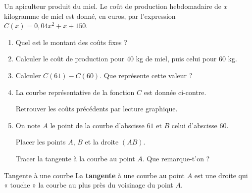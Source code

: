 \documentclass[10pt,a4paper,openany,twoside, eleve]{book}
\begin{document}
\begin{exon}
  Un apiculteur produit du miel.
  Le co\^ut de production hebdomadaire de $x$ kilogramme de miel
  est donné, en euros, par l'expression
  $C(x)=0,04x^2+x+150$.

  \begin{minipage}[t]{0.5\textwidth}
    \vspace{-5.5cm}
    \begin{enumerate}
      \item Quel est le montant des co\^uts fixes ?
      \item Calculer le co\^ut de production pour 40 kg de miel,
            puis celui pour 60 kg.
      \item Calculer $C(61)-C(60)$. Que représente cette valeur ?
      \item La courbe représentative de la fonction $C$ est donnée ci-contre.

            Retrouver les co\^uts précédents par lecture graphique.
      \item On note $A$ le point de la courbe d'abscisse $61$
            et $B$ celui d'abscisse $60$.

            Placer les points $A$, $B$ et la droite $(AB)$.

            Tracer la tangente à la courbe au point $A$.
            Que remarque-t'on ?
    \end{enumerate}
  \end{minipage}
  \begin{minipage}[t]{0.5\textwidth}
  \end{minipage}

\end{exon}

\newpage

\begin{defi}{Tangente à une courbe}{}
  La \textbf{tangente} à une courbe au point $A$ est une droite qui « touche » la courbe au plus près du voisinage du point $A$.
\end{defi}
\end{document}
